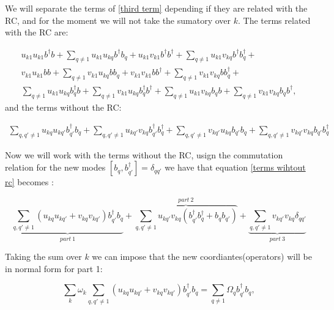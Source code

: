 \documentclass[12pt]{article}
\begin{document}
We will separate the terms of \ref{third term} depending if they are related with the RC, and for the moment we will not take the sumatory over $k$. The terms related with the RC are:

\begin{multline}
    u_{k1} u_{k1} b^{\dagger} b + \sum_{q \neq 1 } u_{k1 } u_{kq } b^{\dagger} b_q + u_{k1} v_{k1} b^{\dagger} b^{\dagger} + \sum_{q \neq 1 } u_{k1 } v_{kq } b^{\dagger} b_q^{\dagger} + \\
     v_{k1} u_{k1} b b + \sum_{q \neq 1 } v_{k1 } u_{kq } b b_q + v_{k1} v_{k1} b b^{\dagger} + \sum_{q \neq 1 } v_{k1 } v_{kq } b b_q^{\dagger} + \\
     \sum_{q \neq 1 } u_{k1 } u_{kq } b_q^{\dagger} b + \sum_{q \neq 1 } v_{k1 } u_{kq } b_q^{\dagger} b^{\dagger} + \sum_{q \neq 1 } u_{k1 } v_{kq } b_q b + \sum_{q \neq 1 } v_{k1 } v_{kq } b_q b^{\dagger},
\end{multline}
and the terms without the RC:

\begin{eqnarray}
\sum_{q,q' \neq 1} u_{kq } u_{kq' }  b_{q'}^{\dagger} b_q + \sum_{q,q' \neq 1} u_{kq' } v_{kq }  b_{q'}^{\dagger} b_q^{\dagger}  + \sum_{q,q' \neq 1} v_{kq' } u_{kq }  b_{q'} b_q + \sum_{q,q' \neq 1} v_{kq' } v_{kq }  b_{q'} b_q ^{\dagger} 
\label{terms wihtout rc}
\end{eqnarray}

Now we will work with the terms without the RC, usign the commutation relation  for the new modes $[b_q,b_{q'}^{\dagger}] =\delta_{qq'} $ we have that equation \ref{terms wihtout rc} becomes :

\begin{equation}
    \underbrace{ \sum_{q,q' \neq 1}   \left(  u_{kq } u_{kq' }+ v_{kq } v_{kq' }  \right) b_{q'}^{\dagger} b_q }_{part\ 1} +  \overbrace{ \sum_{q,q' \neq 1} u_{kq'} v_{kq} \left(  b_{q'}^{\dagger} b_q^{\dagger}  +  b_q b_{q'}  \right) }^{part\ 2} + \underbrace{ \sum_{q,q' \neq 1} v_{kq'} v_{kq} \delta_{qq'} }_{part\ 3}
\end{equation}

Taking the sum over $k$ we can impose that the new coordiantes(operators) will be in normal form for part 1:

\begin{equation}
    \sum_k  \omega_k \sum_{q,q' \neq 1}   \left(  u_{kq } u_{kq' }+ v_{kq } v_{kq' }  \right) b_{q'}^{\dagger} b_q = \sum_{q \neq 1} \Omega_q  b_{q'}^{\dagger} b_q,
\end{equation}
\end{document}
